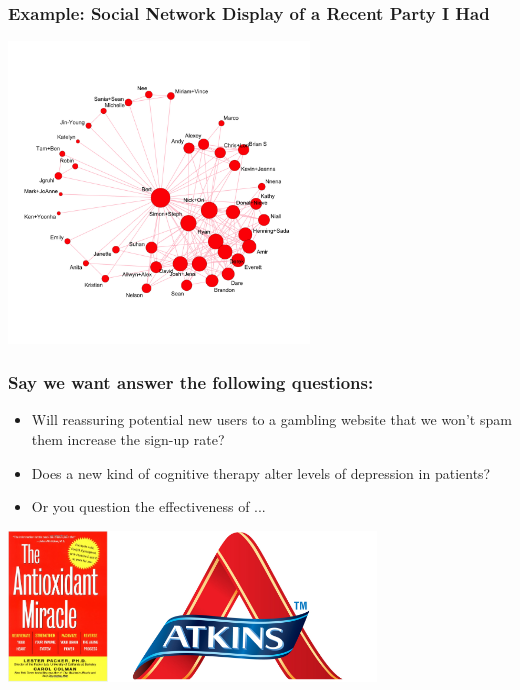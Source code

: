 \documentclass[slides]{beamer}\usepackage[]{graphicx}\usepackage[]{color}
\begin{document}
\begin{frame}[fragile]
\frametitle{Example: Social Network Display of a Recent Party I Had}
\begin{center}
\includegraphics[width=8cm]{figure/network.png}
\end{center}
\end{frame}


\begin{frame}
\frametitle{Say we want answer the following questions:}
\begin{itemize}
\pause\item Will reassuring potential new users to a gambling website that we won't spam them increase the sign-up rate?
\pause\item Does a new kind of cognitive therapy alter levels of depression in patients?
\pause\item Or you question the effectiveness of ...
\end{itemize}

\begin{center}
\includegraphics[height=4cm]{figure/antioxidants.png}\includegraphics[height=4cm]{figure/atkins.jpg}
\end{center}

\end{frame}
\end{document}

